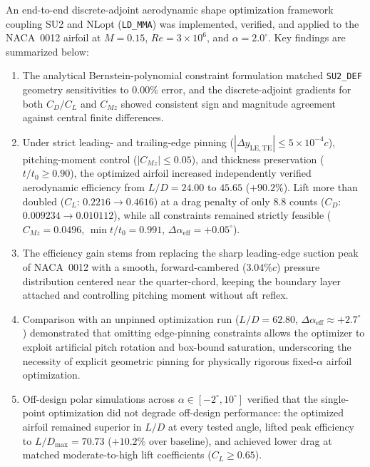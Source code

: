 \documentclass[11pt,a4paper]{article}
\begin{document}
An end-to-end discrete-adjoint aerodynamic shape optimization framework coupling SU2 and NLopt (\texttt{LD\_MMA}) was implemented, verified, and applied to the NACA~0012 airfoil at $M = 0.15$, $Re = 3\times 10^6$, and $\alpha = 2.0^\circ$. Key findings are summarized below:
\begin{enumerate}
    \item The analytical Bernstein-polynomial constraint formulation matched \texttt{SU2\_DEF} geometry sensitivities to $0.00\%$ error, and the discrete-adjoint gradients for both $C_D/C_L$ and $C_{Mz}$ showed consistent sign and magnitude agreement against central finite differences.
    \item Under strict leading- and trailing-edge pinning ($|\Delta y_{\mathrm{LE,TE}}| \leq 5\times 10^{-4}c$), pitching-moment control ($|C_{Mz}| \leq 0.05$), and thickness preservation ($t/t_0 \geq 0.90$), the optimized airfoil increased independently verified aerodynamic efficiency from $L/D = 24.00$ to $45.65$ ($+90.2\%$). Lift more than doubled ($C_L$: $0.2216 \to 0.4616$) at a drag penalty of only $8.8$ counts ($C_D$: $0.009234 \to 0.010112$), while all constraints remained strictly feasible ($C_{Mz} = 0.0496$, $\min t/t_0 = 0.991$, $\Delta\alpha_{\mathrm{eff}} = +0.05^\circ$).
    \item The efficiency gain stems from replacing the sharp leading-edge suction peak of NACA~0012 with a smooth, forward-cambered ($3.04\%c$) pressure distribution centered near the quarter-chord, keeping the boundary layer attached and controlling pitching moment without aft reflex.
    \item Comparison with an unpinned optimization run ($L/D = 62.80$, $\Delta\alpha_{\mathrm{eff}} \approx +2.7^\circ$) demonstrated that omitting edge-pinning constraints allows the optimizer to exploit artificial pitch rotation and box-bound saturation, underscoring the necessity of explicit geometric pinning for physically rigorous fixed-$\alpha$ airfoil optimization.
    \item Off-design polar simulations across $\alpha \in [-2^\circ, 10^\circ]$ verified that the single-point optimization did not degrade off-design performance: the optimized airfoil remained superior in $L/D$ at every tested angle, lifted peak efficiency to $L/D_{\max} = 70.73$ ($+10.2\%$ over baseline), and achieved lower drag at matched moderate-to-high lift coefficients ($C_L \geq 0.65$).
\end{enumerate}
\end{document}
